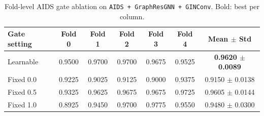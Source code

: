 \begin{table}[t]
\centering
\scriptsize
\setlength{\tabcolsep}{3.5pt}
\caption{Fold-level AIDS gate ablation on \texttt{AIDS + GraphResGNN + GINConv}. Bold: best per column.}
\label{tab:aids_gate_ablation_folds}
\begin{tabular}{lcccccc}
\toprule
Gate setting & Fold 0 & Fold 1 & Fold 2 & Fold 3 & Fold 4 & Mean $\pm$ Std \\
\midrule
Learnable & 0.9500 & 0.9700 & 0.9700 & 0.9675 & 0.9525 & \textbf{0.9620 $\pm$ 0.0089} \\
Fixed 0.0 & 0.9225 & 0.9025 & 0.9125 & 0.9000 & 0.9375 & 0.9150 $\pm$ 0.0138 \\
Fixed 0.5 & 0.9325 & 0.9625 & 0.9675 & 0.9675 & 0.9725 & 0.9605 $\pm$ 0.0144 \\
Fixed 1.0 & 0.8925 & 0.9450 & 0.9700 & 0.9775 & 0.9550 & 0.9480 $\pm$ 0.0300 \\
\bottomrule
\end{tabular}
\end{table}
